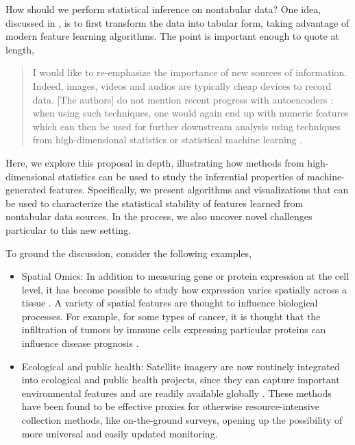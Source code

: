 
How should we perform statistical inference on nontabular data? One idea,
discussed in \citep{buhlmann2019comments}, is to first transform the data into
tabular form, taking advantage of modern feature learning algorithms. The point
is important enough to quote at length,

\begin{quote}
I would like to re-emphasize the importance of new sources of information.
Indeed, images, videos and audios are typically cheap devices to record data.
[The authors] do not mention recent progress with autoencoders
\citep{hinton2006reducing, vincent2010stacked}: when using such techniques, one
would again end up with numeric features which can then be used for further
downstream analysis using techniques from high-dimensional statistics or
statistical machine learning \citep{hastie2015statistical,
  buhlmann2011statistics}.
\end{quote}

Here, we explore this proposal in depth, illustrating how methods from
high-dimensional statistics can be used to study the inferential properties of
machine-generated features. Specifically, we present algorithms and
visualizations that can be used to characterize the statistical stability of
features learned from nontabular data sources. In the process, we also uncover
novel challenges particular to this new setting.

To ground the discussion, consider the following examples,

\begin{itemize}
\item Spatial Omics: In addition to measuring gene or protein expression at the
  cell level, it has become possible to study how expression varies spatially
  across a tissue \citep{lundberg2019spatial}. A variety of spatial features are
  thought to influence biological processes. For example, for some types of
  cancer, it is thought that the infiltration of tumors by immune cells
  expressing particular proteins can influence disease prognosis
  \citep{keren2018structured}.
\item Ecological and public health: Satellite imagery are now routinely
  integrated into ecological and public health projects, since they can capture
  important environmental features and are readily available
  globally \citep{rolf2020generalizable, bondimapping}. These methods have been
  found to be effective proxies for otherwise resource-intensive collection
  methods, like on-the-ground surveys, opening up the possibility of more
  universal and easily updated monitoring.
\end{itemize}

